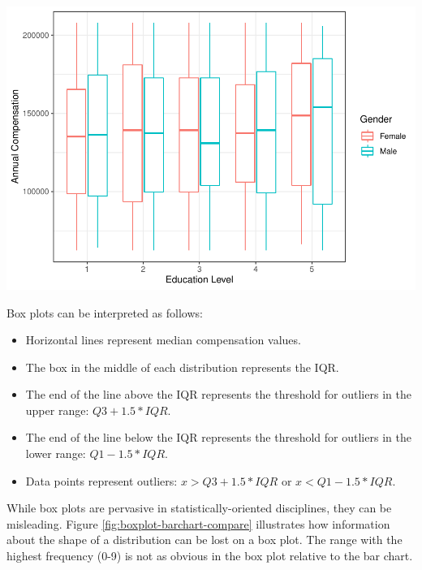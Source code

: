 \documentclass[
]{book}
\providecommand{\tightlist}{%
  \setlength{\itemsep}{0pt}\setlength{\parskip}{0pt}}
\begin{document}
\includegraphics{The_Fundamentals_of_People_Analytics_files/figure-latex/unnamed-chunk-109-1.pdf}

Box plots can be interpreted as follows:

\begin{itemize}
\tightlist
\item
  Horizontal lines represent median compensation values.
\item
  The box in the middle of each distribution represents the IQR.
\item
  The end of the line above the IQR represents the threshold for outliers in the upper range: \(Q3 + 1.5 * IQR\).
\item
  The end of the line below the IQR represents the threshold for outliers in the lower range: \(Q1 - 1.5 * IQR\).
\item
  Data points represent outliers: \(x > Q3 + 1.5 * IQR\) or \(x < Q1 - 1.5 * IQR\).
\end{itemize}

While box plots are pervasive in statistically-oriented disciplines, they can be misleading. Figure \ref{fig:boxplot-barchart-compare} illustrates how information about the shape of a distribution can be lost on a box plot. The range with the highest frequency (0-9) is not as obvious in the box plot relative to the bar chart.
\end{document}
